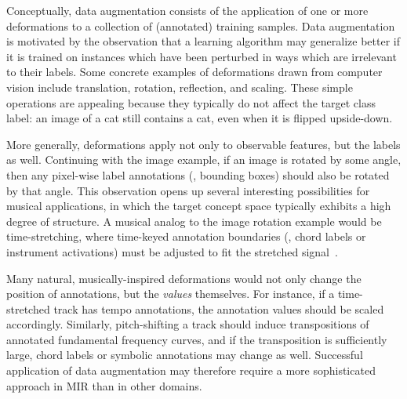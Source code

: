 \documentclass{article}
\begin{document}
Conceptually, data augmentation consists of the application of one or more deformations to
a collection of (annotated) training samples.
Data augmentation is motivated by the observation that a learning algorithm may
generalize better if it is trained on instances which have been perturbed in ways 
which are irrelevant to their labels.
Some concrete examples of deformations drawn from computer vision include translation,
rotation, reflection, and scaling.
These simple operations are appealing because they typically do not affect the target 
class label: an image of a cat still contains a cat, even when it is flipped upside-down.

More generally, deformations apply not only to observable features, but the labels as well.
Continuing with the image example, if an image is rotated by some angle, 
then any pixel-wise label annotations (\eg, bounding boxes) should also be rotated by
that angle.
This observation opens up several interesting possibilities for musical applications, in
which the target concept space typically exhibits a high degree of structure.
A musical analog to the image rotation example would be time-stretching,
where time-keyed annotation boundaries (\eg, chord labels or instrument
activations) must be adjusted to fit the stretched signal~\cite{mauch2013audio}.

Many natural, musically-inspired deformations would not only change the position of
annotations, but the \emph{values} themselves.
For instance, if a time-stretched track has tempo annotations, the annotation values
should be scaled accordingly.
Similarly, pitch-shifting a track should induce transpositions of annotated fundamental
frequency curves, and if the transposition is sufficiently large, chord labels or symbolic 
annotations may change as well.
Successful application of data augmentation may therefore require a more sophisticated approach in MIR
than in other domains.

\end{document}
